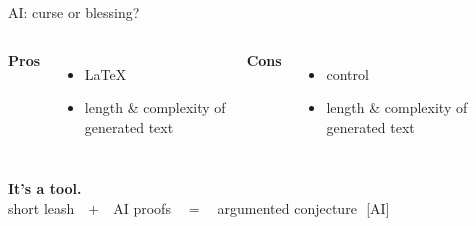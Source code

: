 \documentclass[aspectratio=1610,11pt]{beamer}
\newcommand{\aimedal}{\,[AI]}
\begin{document}
\begin{frame}{AI: curse or blessing?}
\vspace{4pt}
\begin{columns}[T,onlytextwidth]
{\large\color{vertexgreen!60!black}\bfseries Pros}
\begin{itemize}
\item \LaTeX{}
\item length \& complexity of\\ generated text
\end{itemize}
{\large\color{vertexred}\bfseries Cons}
\begin{itemize}
\item control
\item length \& complexity of\\ generated text
\end{itemize}
\end{columns}
\vspace{8pt}
\hspace*{0.9cm}{\color{KULblauw3a}\rule{0.82\paperwidth}{1.1pt}}
\vfill
\begin{center}
{\Large\color{KULblauw3b}\bfseries It's a tool.}\\[8pt]
{\normalsize short leash\ \ $+$\ \ AI proofs\ \ $=$\ \ argumented conjecture\ \aimedal}
\end{center}
\vfill
\end{frame}
\end{document}
